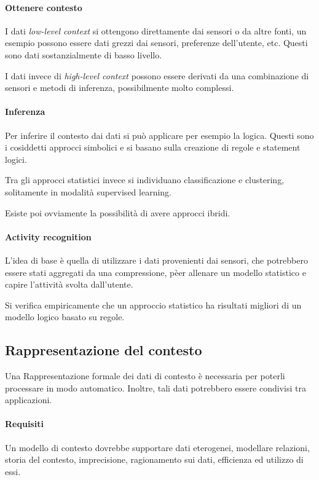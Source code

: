 \paragraph{Ottenere contesto}
I dati \emph{low-level context} si ottengono direttamente dai sensori o da 
altre fonti, un esempio possono essere dati grezzi dai sensori, preferenze dell'utente, etc.
Questi sono dati sostanzialmente di basso livello.

I dati invece di \emph{high-level context} possono essere derivati da una combinazione di 
sensori e metodi di inferenza, possibilmente molto complessi.

\paragraph{Inferenza}
Per inferire il contesto dai dati si può applicare per esempio la logica. Questi 
sono i cosiddetti approcci simbolici e si basano sulla creazione di regole 
e statement logici.

Tra gli approcci statistici invece si individuano classificazione e clustering, 
solitamente in modalità supervised learning.

Esiste poi ovviamente la possibilità di avere approcci ibridi.

\paragraph{Activity recognition}
L'idea di base è quella di utilizzare i dati provenienti
dai sensori, che potrebbero essere stati aggregati 
da una compressione, pèer allenare un modello statistico 
e capire l'attività svolta dall'utente.

Si verifica empiricamente che un approccio statistico 
ha risultati migliori di un modello logico basato su regole.

\subsection{Rappresentazione del contesto}

Una Rappresentazione formale dei dati di contesto 
è necessaria per poterli processare in modo automatico. 
Inoltre, tali dati potrebbero essere condivisi tra applicazioni. 

\paragraph{Requisiti}
Un modello di contesto dovrebbe supportare dati eterogenei, 
modellare relazioni, storia del contesto, imprecisione, 
ragionamento sui dati, efficienza ed utilizzo di essi.

